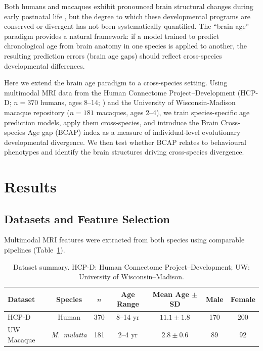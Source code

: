 \documentclass[11pt]{article}
\begin{document}
Both humans and macaques exhibit pronounced brain structural changes during early postnatal life \citep{leigh2004brain, bethlehem2022brain, garin2022mapping}, but the degree to which these developmental programs are conserved or divergent has not been systematically quantified. The ``brain age'' paradigm \citep{cole2017predicting, franke2019ten} provides a natural framework: if a model trained to predict chronological age from brain anatomy in one species is applied to another, the resulting prediction errors (brain age gaps) should reflect cross-species developmental differences.

Here we extend the brain age paradigm to a cross-species setting. Using multimodal MRI data from the Human Connectome Project--Development (HCP-D; $n = 370$ humans, ages 8--14; \citealt{somerville2018lifespan}) and the University of Wisconsin-Madison macaque repository ($n = 181$ macaques, ages 2--4), we train species-specific age prediction models, apply them cross-species, and introduce the Brain Cross-species Age gap (BCAP) index as a measure of individual-level evolutionary developmental divergence. We then test whether BCAP relates to behavioural phenotypes and identify the brain structures driving cross-species divergence.

\section{Results}

\subsection{Datasets and Feature Selection}

Multimodal MRI features were extracted from both species using comparable pipelines (Table~\ref{tab:datasets}).

\begin{table}[H]
\centering
\caption{Dataset summary. HCP-D: Human Connectome Project--Development; UW: University of Wisconsin--Madison.}
\label{tab:datasets}
\begin{tabular}{lcccccc}
\toprule
Dataset & Species & $n$ & Age Range & Mean Age $\pm$ SD & Male & Female \\
\midrule
HCP-D & Human & 370 & 8--14 yr & $11.1 \pm 1.8$ & 170 & 200 \\
UW Macaque & \emph{M.\ mulatta} & 181 & 2--4 yr & $2.8 \pm 0.6$ & 89 & 92 \\
\bottomrule
\end{tabular}
\end{table}
\end{document}
